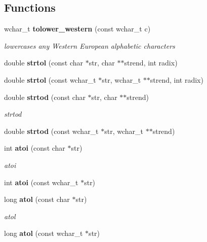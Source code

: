 \subsection*{Functions}
\begin{DoxyCompactItemize}
\item 
wchar\+\_\+t {\bf tolower\+\_\+western} (const wchar\+\_\+t c)\label{namespacestring__util_a65ecd19fe84afd9cff4f1715f9364141}

\begin{DoxyCompactList}\small\item\em lowercases any Western European alphabetic characters \end{DoxyCompactList}\item 
double {\bf strtol} (const char $\ast$str, char $\ast$$\ast$strend, int radix)
\item 
double {\bfseries strtol} (const wchar\+\_\+t $\ast$str, wchar\+\_\+t $\ast$$\ast$strend, int radix)\label{namespacestring__util_a6acf272c0e68f0b5f2381ad59db3055c}

\item 
double {\bf strtod} (const char $\ast$str, char $\ast$$\ast$strend)\label{namespacestring__util_a563de3552dde86286bcff20cfaac49a9}

\begin{DoxyCompactList}\small\item\em strtod \end{DoxyCompactList}\item 
double {\bfseries strtod} (const wchar\+\_\+t $\ast$str, wchar\+\_\+t $\ast$$\ast$strend)\label{namespacestring__util_a75191bc768437cc444054667f18af344}

\item 
int {\bf atoi} (const char $\ast$str)\label{namespacestring__util_adf6fc44dacb428d9928401574d5bc819}

\begin{DoxyCompactList}\small\item\em atoi \end{DoxyCompactList}\item 
int {\bfseries atoi} (const wchar\+\_\+t $\ast$str)\label{namespacestring__util_a4f2cd4dfa1c657252314e26c608a835c}

\item 
long {\bf atol} (const char $\ast$str)\label{namespacestring__util_a99328118377e46b338d4008931489f0b}

\begin{DoxyCompactList}\small\item\em atol \end{DoxyCompactList}\item 
long {\bfseries atol} (const wchar\+\_\+t $\ast$str)\label{namespacestring__util_a4ace5ad59eefb2ad3aa290ff6ee45dcd}


\end{DoxyCompactItemize}
